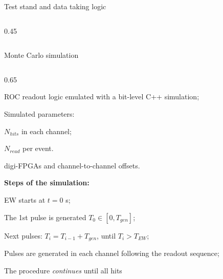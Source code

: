 \documentclass{beamer}
\begin{document}
\begin{frame}{Test stand and data taking logic}
\begin{columns}
\begin{column}{0.45\framewidth}
\begin{figure}[h!]
        \label{fig:enter-label} 
    \end{figure}
\end{column}
\end{columns}




          \end{frame}




\begin{frame}{Monte Carlo simulation}


   \vspace{-3mm}
   \begin{columns}
 \begin{column}{0.65\framewidth} 

       \begin{itemize}
       {\footnotesize
           \item ROC readout logic emulated with a bit-level C++ simulation;
           \vspace{0.8mm}
           \item Simulated parameters:
          \vspace{0.8mm}
           \begin{itemize}
            {\footnotesize  \item $N_{hits}$ in each channel;
               \item $N_{read}$ per event.}
           \end{itemize}
          \vspace{0.8mm}
           \item digi-FPGAs and channel-to-channel offsets. }
       \end{itemize}
      \vspace{0.8mm}
      {\footnotesize  \textbf{Steps of the simulation:}}
     \vspace{0.8mm}
\begin{itemize}
{\footnotesize
\item EW starts at $t=0$ s;
\vspace{0.8mm}
 \item The 1st pulse is generated $T_0\in [0 ,T_{gen}]$;
\vspace{0.8mm}
   \item Next pulses: $T_i = T_{i-1} + T_{gen}$, until $T_i> T_{EW}$;
   \vspace{0.8mm}
\item Pulses are generated in each channel following the readout sequence;
\vspace{0.8mm}
 \item The procedure \textit{continues} until all hits 
}
\end{itemize}
\end{column}
\end{columns}
\end{frame}
\end{document}
